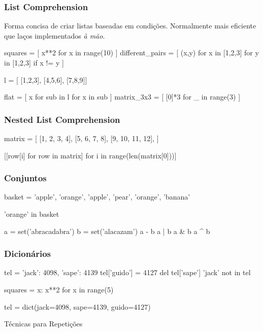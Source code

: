 \documentclass[aspectratio=169,14pt]{beamer}
\begin{document}
\begin{frame}[fragile]
    \frametitle{List Comprehension}
    Forma concisa de criar listas baseadas em condições. Normalmente
    mais eficiente que laços implementados \textit{à mão}.
    \begin{python}
        squares = [ x**2 for x in range(10) ]
        different_pairs = [ (x,y) for x in [1,2,3]
                                  for y in [1,2,3] if x != y ]

        l = [ [1,2,3], [4,5,6], [7,8,9]]

        flat = [ x for sub in l for x in sub ]
        matrix_3x3 = [ [0]*3 for _ in range(3) ]
    \end{python}
\end{frame}

\begin{frame}[fragile]
    \frametitle{Nested List Comprehension}
    \begin{python}
        matrix = [
            [1, 2, 3, 4],
            [5, 6, 7, 8],
            [9, 10, 11, 12],
        ]

        [[row[i] for row in matrix]
            for i in range(len(matrix[0]))]
    \end{python}
\end{frame}

\begin{frame}[fragile]
    \frametitle{Conjuntos}
    \begin{python}
        basket = {'apple', 'orange', 'apple',
                  'pear', 'orange', 'banana'}

        'orange' in basket

        a = set('abracadabra')
        b = set('alacazam')
        a - b
        a | b
        a & b
        a ^ b
    \end{python}
\end{frame}

\begin{frame}[fragile]
    \frametitle{Dicionários}
    \begin{python}
        tel = {'jack': 4098, 'sape': 4139}
        tel['guido'] = 4127
        del tel['sape']
        'jack' not in tel

        squares = { x: x**2 for x in range(5) }

        tel = dict(jack=4098, sape=4139, guido=4127)
    \end{python}
\end{frame}

\begin{frame}
    \begin{center}
        \Huge Técnicas para Repetições
    \end{center}
\end{frame}
\end{document}
